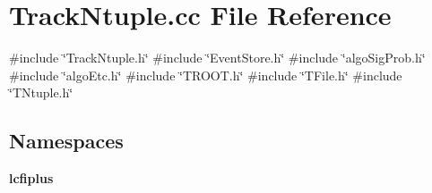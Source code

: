 \section{Track\+Ntuple.\+cc File Reference}
\label{TrackNtuple_8cc}
{\ttfamily \#include \char`\"{}Track\+Ntuple.\+h\char`\"{}}\newline
{\ttfamily \#include \char`\"{}Event\+Store.\+h\char`\"{}}\newline
{\ttfamily \#include \char`\"{}algo\+Sig\+Prob.\+h\char`\"{}}\newline
{\ttfamily \#include \char`\"{}algo\+Etc.\+h\char`\"{}}\newline
{\ttfamily \#include \char`\"{}T\+R\+O\+O\+T.\+h\char`\"{}}\newline
{\ttfamily \#include \char`\"{}T\+File.\+h\char`\"{}}\newline
{\ttfamily \#include \char`\"{}T\+Ntuple.\+h\char`\"{}}\newline
\subsection*{Namespaces}
\begin{DoxyCompactItemize}
\item 
 \textbf{ lcfiplus}
\end{DoxyCompactItemize}
